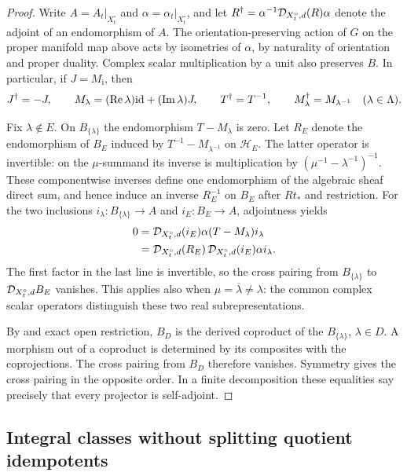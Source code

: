 \begin{proof}
Write $A=A_t|_{X_t^\circ}$ and $\alpha=\alpha_t|_{X_t^\circ}$, and
let $R^\dagger=\alpha^{-1}\mathcal D_{X_t^\circ,d}(R)\alpha$ denote the adjoint
of an endomorphism of $A$.  The orientation-preserving action of $G$
on the proper manifold map above acts by isometries of $\alpha$,
by naturality of orientation and proper duality.  Complex scalar
multiplication by a unit also preserves $B$.  In particular, if
$J=M_{\mathrm i}$, then
\[
 J^\dagger=-J,\qquad
 M_\lambda=(\operatorname{Re}\lambda)\mathrm{id}+
               (\operatorname{Im}\lambda)J,\qquad
 T^\dagger=T^{-1},\qquad M_\lambda^\dagger=M_{\lambda^{-1}}
 \quad(\lambda\in\Lambda).
\]

Fix $\lambda\notin E$.  On $B_{\{\lambda\}}$ the endomorphism
$T-M_\lambda$ is zero.  Let $R_E$ denote the endomorphism of $B_E$
induced by $T^{-1}-M_{\lambda^{-1}}$ on $\mathcal H_E$.
The latter operator is invertible: on the $\mu$-summand its
inverse is multiplication by
$(\mu^{-1}-\lambda^{-1})^{-1}$.  These componentwise inverses define
one endomorphism of the algebraic sheaf direct sum, and hence induce
an inverse $R_E^{-1}$ on $B_E$ after $Rt_*$ and restriction.
For the two inclusions $i_\lambda:B_{\{\lambda\}}\to A$ and
$i_E:B_E\to A$, adjointness yields
\[
 \begin{split}
 0
 &=\mathcal D_{X_t^\circ,d}(i_E)\alpha(T-M_\lambda)i_\lambda\\
 &=\mathcal D_{X_t^\circ,d}(R_E)\,
       \mathcal D_{X_t^\circ,d}(i_E)\alpha i_\lambda.
 \end{split}
\]
The first factor in the last line is invertible, so the cross pairing
from $B_{\{\lambda\}}$ to $\mathcal D_{X_t^\circ,d}B_E$ vanishes.
This applies also when $\mu=\overline\lambda\ne\lambda$: the common
complex scalar operators distinguish these two real subrepresentations.

By  and exact open restriction, $B_D$
is the derived coproduct of the $B_{\{\lambda\}}$, $\lambda\in D$.
A morphism out of a coproduct is determined by its composites with
the coprojections.  The cross pairing from $B_D$ therefore vanishes.
Symmetry gives the cross pairing in the opposite order.  In a finite
decomposition these equalities say precisely that every projector is
self-adjoint.
\end{proof}

\subsection{Integral classes without splitting quotient idempotents}

